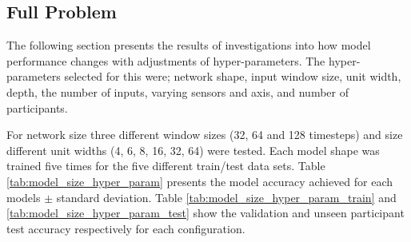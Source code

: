 \documentclass[sensors,article,submit,moreauthors,pdftex]{Definitions/mdpi}
\begin{document}
\subsection{Full Problem}
The following section presents the results of investigations into how model performance changes with adjustments of hyper-parameters. The hyper-parameters selected for this were; network shape, input window size, unit width, depth, the number of inputs, varying sensors and axis, and number of participants.

For network size three different window sizes (32, 64 and 128 timesteps) and size different unit widths (4, 6, 8, 16, 32, 64) were tested. Each model shape was trained five times for the five different train/test data sets. Table \ref{tab:model_size_hyper_param} presents the model accuracy achieved for each models $\pm$ standard deviation. Table \ref{tab:model_size_hyper_param_train} and \ref{tab:model_size_hyper_param_test} show the validation and unseen participant test accuracy respectively for each configuration.
\end{document}
